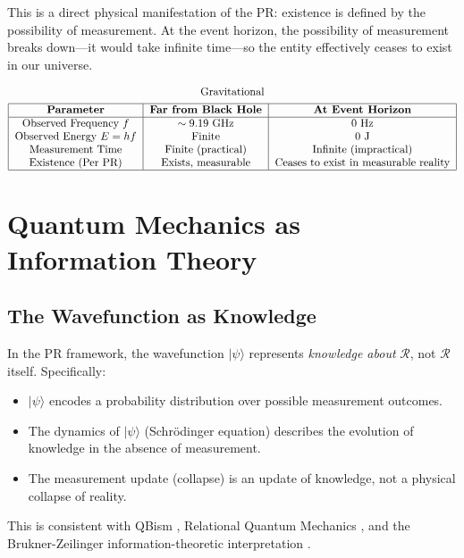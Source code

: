 \documentclass[aps,preprint,showpacs,showkeys]{revtex4}%
\begin{document}
This is a direct physical manifestation of the PR: existence is defined by
the possibility of measurement. At the event horizon, the possibility of
measurement breaks down---it would take infinite time---so the entity
effectively ceases to exist in our universe.

\begin{gather}
\text{Gravitational} \\
\begin{tabular}{|c|c|c|}
\hline
\textbf{Parameter} & \textbf{Far from Black Hole} & \textbf{At Event Horizon}
\\ \hline
Observed Frequency $f$ & $\sim 9.19$ GHz & $0$ Hz \\ 
Observed Energy $E=hf$ & Finite & $0$ J \\ 
Measurement Time & Finite (practical) & Infinite (impractical) \\ 
Existence (Per PR) & Exists, measurable & Ceases to exist in measurable
reality \\ \hline
\end{tabular}%
\end{gather}

\section{Quantum Mechanics as Information Theory}

\subsection{The Wavefunction as Knowledge}

In the PR framework, the wavefunction $|\psi\rangle$ represents \emph{%
knowledge about} $\mathcal{R}$, not $\mathcal{R}$ itself. Specifically:

\begin{itemize}
\item $|\psi\rangle$ encodes a probability distribution over possible
measurement outcomes.

\item The dynamics of $|\psi\rangle$ (Schr\"odinger equation) describes the
evolution of knowledge in the absence of measurement.

\item The measurement update (collapse) is an update of knowledge, not a
physical collapse of reality.
\end{itemize}

This is consistent with QBism \cite{Fuchs2010}, Relational Quantum Mechanics 
\cite{Rovelli1996}, and the Brukner-Zeilinger information-theoretic
interpretation \cite{Brukner2001}.
\end{document}
